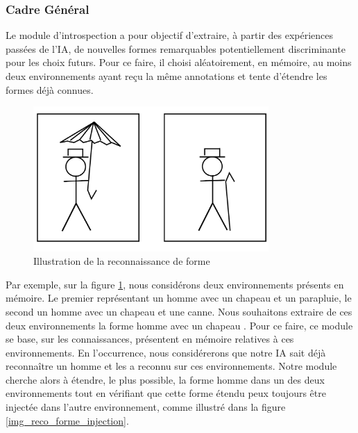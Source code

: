 
\subsubsection{Cadre Général}

Le module d'introspection a pour objectif d'extraire, à partir des expériences passées de l'IA, de nouvelles formes remarquables potentiellement discriminante pour les choix futurs. Pour ce faire, il choisi aléatoirement, en mémoire, au moins deux environnements ayant reçu la même annotations et tente d'étendre les formes déjà connues.

\begin{figure}[H] 
\begin{center}
\includegraphics[width=0.8\textwidth]{files/raisonneur/reconnaissance_de_formes_0} 
\end{center}
\caption{Illustration de la reconnaissance de forme} 
\label{img_reco_forme_0}
\end{figure}

Par exemple, sur la figure \ref{img_reco_forme_0}, nous considérons deux environnements présents en mémoire. Le premier représentant un homme avec un chapeau et un parapluie, le second un homme avec un chapeau et une canne. Nous souhaitons extraire de ces deux environnements la forme \og homme avec un chapeau \fg{}. Pour ce faire, ce module se base, sur les connaissances, présentent en mémoire relatives à ces environnements. En l'occurrence, nous considérerons que notre IA sait déjà reconnaître un homme et les a reconnu sur ces environnements. Notre module cherche alors à étendre, le plus possible, la forme \og homme \fg dans un des deux environnements tout en vérifiant que cette forme étendu peux toujours être injectée dans l'autre environnement, comme illustré dans la figure \ref{img_reco_forme_injection}.

